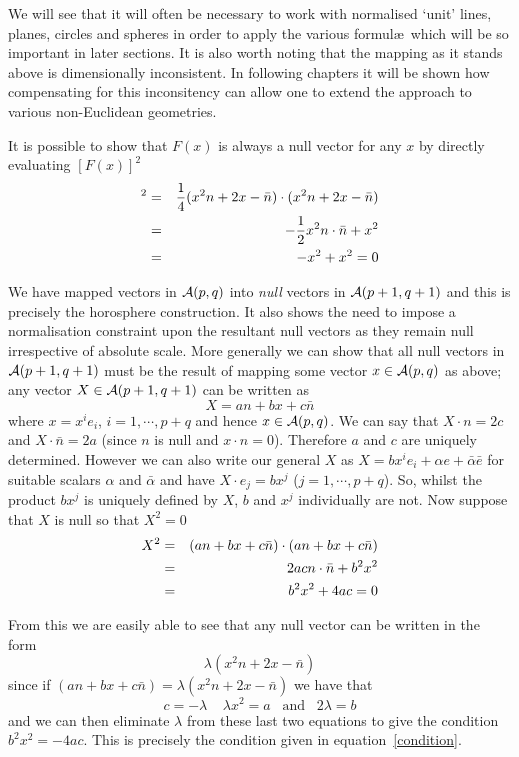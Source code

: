 We will see that it will often be necessary to work with
normalised `unit' lines, planes, circles and spheres in order to
apply the various formul\ae\ which will be so
important in later sections. It is also worth noting that the
mapping as it stands above is dimensionally inconsistent. In following
chapters it will be shown how compensating for this inconsitency 
can allow one to extend the approach to various non-Euclidean geometries.

It is possible to show that $F(x)$ is always a null vector for
any $x$ by directly evaluating $[F(x)]^2$
%
\begin{eqnarray}
 [F(x)]^2 & = &  \frac{1}{4}(x^2n + 2x - \bar{n})\cdot (x^2n + 2x - \bar{n}) \nn \\
              & = & -\frac{1}{2}x^2 n\cdot \bar{n} + x^2  \nn \\
              & = &  -x^2 + x^2 = 0
\end{eqnarray}
%

We have mapped vectors in ${\mathcal{A}}(p,q)$ into \emph{null}
vectors in ${\mathcal{A}}(p+1,q+1)$ and this is precisely the horosphere 
construction. It also shows the need to impose a normalisation
constraint upon the resultant null vectors as they remain null 
irrespective of absolute scale.
More generally we can show that all null vectors in $\mathcal{A}(p+1,q+1)$
must be the result of mapping some vector $x \in \mathcal{A}(p,q)$ as above;
any vector $X \in {\mathcal{A}}(p+1,q+1)$ can be written as
%
\[ X = an + bx + c\bar{n}  \]
%
where $x = x^ie_i$, $i=1,\cdots,p+q$ and hence $x \in \mathcal{A}(p,q)$.
We can say that $X\cdot n = 2c$ and $X\cdot \bar{n}=2a$ (since $n$ is 
null and $x\cdot n = 0$). Therefore $a$
and $c$ are uniquely determined. However we can also write our
general $X$ as  $X=b{x}^ie_i + \alpha e + \bar{\alpha}\bar{e}$ for 
suitable scalars $\alpha$ and $\bar{\alpha}$ and
have $X\cdot e_j= bx^j$ ($j=1,\cdots,p+q$). So, whilst the product
$bx^j$ is uniquely defined by $X$, $b$ and $x^j$ individually are
not. Now suppose that $X$ is null so that $X^2=0$
%
\begin{eqnarray}
X^2 & = &   (an + bx + c\bar{n})\cdot (an + bx + c\bar{n}) \nonumber \\
       & = &  2ac n\cdot \bar{n} + b^2x^2 \nonumber \\
       & = & b^2x^2 + 4ac = 0
       \label{condition}
\end{eqnarray}
%

From this we are easily able to see that any null vector can be
written in the form
%
\begin{equation}
\lambda (x^2n + 2x - \bar{n}) \label{null}
\end{equation} 
%
since if $(an + bx + c\bar{n}) = \lambda(x^2n + 2x -
\bar{n})$ we have that
%
\[c=-\lambda\;\;\;\; \lambda x^2 = a \;\;\;\mbox{and}\;\;\; 2\lambda = b\]
%
and we can then eliminate $\lambda$ from these last two
equations to give the condition $b^2 x^2 = -4ac$. This
is precisely the condition given in
equation~\ref{condition}.

